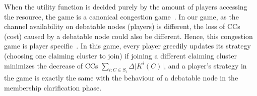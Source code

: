 \documentclass[times]{ettauth}
\theoremstyle{mytheoremstyle}
\theoremstyle{mytheoremstyle}
\theoremstyle{mytheoremstyle}
\begin{document}
When the utility function is decided purely by the amount of players accessing the resource, the game is a canonical congestion game~\cite{Ackermann06purenash}.
In our game, as the channel availability on debatable nodes (players) is different, the loss of CCs (cost) caused by a debatable node could also be different.
Hence, this congestion game is player specific~\cite{Ackermann06purenash}.
In this game, every player greedily updates its strategy (choosing one claiming cluster to join) if joining a different claiming cluster minimizes the decrease of CCs $\sum_{i:C\in S_i} \Delta\vert K^i(C) \vert$, and a player's strategy in the game is exactly the same with the behaviour of a debatable node in the membership clarification phase.






\end{document}
